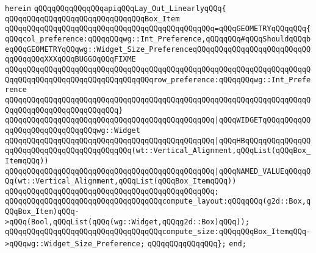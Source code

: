\verb|herein|\newline
\newline
\verb|qQQqqQQqqQQqqQQqapiqQQqLay_Out_LinearlyqQQq{|\newline
\newline
\verb|qQQqqQQqqQQqqQQqqQQqqQQqqQQqqQQqBox_Item|\newline
\verb|qQQqqQQqqQQqqQQqqQQqqQQqqQQqqQQqqQQqqQQqqQQqqQQq=qQQqGEOMETRYqQQqqQQq{qQQqcol_preference:qQQqqQQqwg::Int_Preference,qQQqqQQq#qQQqShouldqQQqbeqQQqGEOMETRYqQQqwg::Widget_Size_PreferenceqQQqqQQqqQQqqQQqqQQqqQQqqQQqqQQqqQQqXXXqQQqBUGGOqQQqFIXME|\newline
\verb|qQQqqQQqqQQqqQQqqQQqqQQqqQQqqQQqqQQqqQQqqQQqqQQqqQQqqQQqqQQqqQQqqQQqqQQqqQQqqQQqqQQqqQQqqQQqqQQqqQQqqQQqrow_preference:qQQqqQQqwg::Int_Preference|\newline
\verb|qQQqqQQqqQQqqQQqqQQqqQQqqQQqqQQqqQQqqQQqqQQqqQQqqQQqqQQqqQQqqQQqqQQqqQQqqQQqqQQqqQQqqQQqqQQqqQQq}|\newline
\verb|qQQqqQQqqQQqqQQqqQQqqQQqqQQqqQQqqQQqqQQqqQQqqQQq|\verb#|qQQqWIDGETqQQqqQQqqQQqqQQqqQQqqQQqqQQqqQQqwg::Widget#\newline
\verb|qQQqqQQqqQQqqQQqqQQqqQQqqQQqqQQqqQQqqQQqqQQqqQQq|\verb#|qQQqHBqQQqqQQqqQQqqQQqqQQqqQQqqQQqqQQqqQQqqQQqqQQq(wt::Vertical_Alignment,qQQqList(qQQqBox_ItemqQQq))#\newline
\verb|qQQqqQQqqQQqqQQqqQQqqQQqqQQqqQQqqQQqqQQqqQQqqQQq|\verb#|qQQqNAMED_VALUEqQQqqQQq(wt::Vertical_Alignment,qQQqList(qQQqBox_ItemqQQq))#\newline
\verb|qQQqqQQqqQQqqQQqqQQqqQQqqQQqqQQqqQQqqQQqqQQqqQQq;|\newline
\newline
\verb|qQQqqQQqqQQqqQQqqQQqqQQqqQQqqQQqqQQqcompute_layout:qQQqqQQq(g2d::Box,qQQqBox_Item)qQQq->qQQq(Bool,qQQqList(qQQq(wg::Widget,qQQqg2d::Box)qQQq));|\newline
\newline
\verb|qQQqqQQqqQQqqQQqqQQqqQQqqQQqqQQqqQQqcompute_size:qQQqqQQqBox_ItemqQQq->qQQqwg::Widget_Size_Preference;|\newline
\verb|qQQqqQQqqQQqqQQq};|\newline
\newline
\verb|end;|\newline

